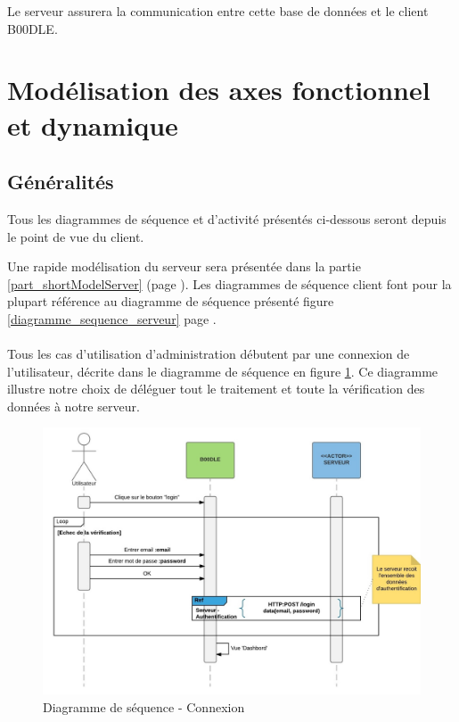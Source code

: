 \documentclass[titlepage]{report}
\begin{document}
\par Le serveur assurera la communication entre cette base de données et le client B00DLE.

\clearpage

\section{Modélisation des axes fonctionnel et dynamique}

\subsection{Généralités}

\par Tous les diagrammes de séquence et d'activité présentés ci-dessous seront depuis le point de vue du client.
\par Une rapide modélisation du serveur sera présentée dans la partie \ref{part_shortModelServer} (page \pageref{part_shortModelServer}). Les diagrammes de séquence client font pour la plupart référence au diagramme de séquence présenté figure \ref{diagramme_sequence_serveur} page \pageref{diagramme_sequence_serveur}.

\paragraph{} Tous les cas d'utilisation d'administration débutent par une connexion de l'utilisateur, décrite dans le diagramme de séquence en figure \ref{diagramme_sequence_connexion}. Ce diagramme illustre notre choix de déléguer tout le traitement et toute la vérification des données à notre serveur.

\begin{figure}[h]
	\caption{Diagramme de séquence - Connexion}
	\label{diagramme_sequence_connexion}
	\centering
	\includegraphics[width=\textwidth]{figures/diagrammes/sequence_connexion.png}
\end{figure}
\end{document}
